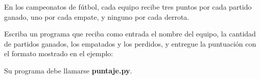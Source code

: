 \documentclass[12pt,spanish,letterpaper]{article}
\begin{document}
  En los campeonatos de fútbol,
  cada equipo recibe tres puntos por cada partido ganado,
  uno por cada empate, y ninguno por cada derrota.

  Escriba un programa que reciba como entrada
  el nombre del equipo,
  la cantidad de partidos ganados,
  los empatados y los perdidos,
  y entregue la puntuación
  con el formato mostrado en el ejemplo:

  \begin{minipage}[t]{.5\textwidth}
    
  \end{minipage}

  Su programa debe llamarse \textbf{puntaje.py}.
\end{document}
